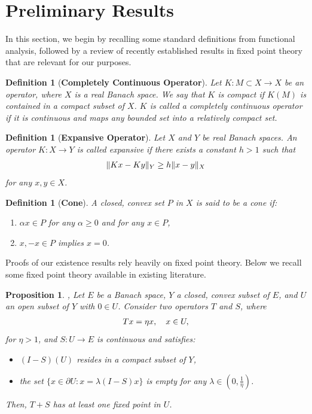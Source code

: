 \documentclass[reqno, 12pt]{amsart}
\newtheorem{pro}{Proposition}[section]
\newtheorem{definition}[theorem]{Definition}
\numberwithin{equation}{section}
\begin{document}
\section{Preliminary Results}
\label{prelim}

In this section, we begin by recalling some standard definitions from functional analysis, followed by a review of recently established results in fixed point theory that are relevant for our purposes.

\begin{definition}[{\bf Completely Continuous Operator}]
Let $K: M \subset X \to X$ be an operator, where $X$ is a real Banach space. We say that $K$ is compact if $K(M)$ is contained in a compact subset of $X$. $K$ is called a completely continuous operator if it is continuous and maps any bounded set into a relatively compact set.
\end{definition}
\begin{definition}[{\bf Expansive Operator}]
Let $X$ and $Y$ be real Banach spaces. An operator $K: X \to Y$ is called expansive if there exists a constant $h > 1$ such that
\begin{align}
\|Kx - Ky\|_Y \geq h\|x - y\|_X \notag
\end{align}
for any $x, y \in X$.
\end{definition}
\begin{definition}[{\bf Cone}]
A closed, convex set $P$ in $X$ is said to be a cone if:
\begin{enumerate}
\item $\alpha x \in P$ for any $\alpha \geq 0$ and for any $x \in P$,
\item $x, -x \in P$ implies $x = 0$.
\end{enumerate}
\end{definition}
Proofs of our existence results rely heavily on fixed point theory. Below we recall some fixed point theory available in existing literature. 
\begin{pro}
\label{thm:fixed-point1}
\cite[Thm. \ 2.1]{4}, \cite[Thm. \ 2.1]{7} Let $E$ be a Banach space, $Y$ a closed, convex subset of $E$, and $U$ an open subset of $Y$ with $0 \in U$. Consider two operators $T$ and $S$, where
\begin{align}
Tx = \eta x, \quad x \in U, \notag
\end{align}
for $\eta > 1$, and $S: U \to E$ is continuous and satisfies:
\begin{itemize}
\item[(i)] $(I - S)(U)$ resides in a compact subset of $Y$,
\item[(ii)] the set $\{x \in \partial U : x = \lambda(I - S)x\}$ is empty for any $\lambda \in \left(0, \frac{1}{\eta}\right)$.
\end{itemize}
Then, $T + S$ has at least one fixed point in $U$.
\end{pro}
\end{document}
